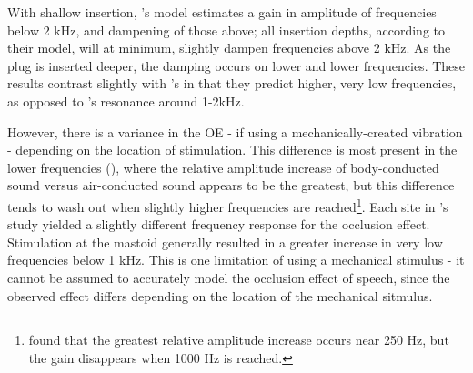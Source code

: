 With shallow insertion, \cite{stenfelt:07}'s model estimates a gain in amplitude of frequencies below 2 kHz, and dampening of those above; all insertion depths, according to their model, will at minimum, slightly dampen frequencies above 2 kHz.  As the plug is inserted deeper, the damping occurs on lower and lower frequencies. These results contrast slightly with \cite{bekesy:60}'s%
in that they predict higher, very low frequencies, as opposed to \cite{bekesy:60}'s%
resonance around 1-2kHz.

However, there is a variance in the OE - if using a mechanically-created vibration - depending on the location of stimulation.  This difference is most present in the lower frequencies (\cite{dean:00}), where the relative amplitude increase of body-conducted sound versus air-conducted sound appears to be the greatest, but this difference tends to wash out when slightly higher frequencies are reached\footnote{\cite{dean:00} found that the greatest relative amplitude increase occurs near 250 Hz, but the gain disappears when 1000 Hz is reached.}.  Each site in \cite{stenfelt:07}'s study yielded a slightly different frequency response for the occlusion effect.  Stimulation at the mastoid generally resulted in a greater increase in very low frequencies below 1 kHz.  This is one limitation of using a mechanical stimulus - it cannot be assumed to accurately model the occlusion effect of speech, since the observed effect differs depending on the location of the mechanical sitmulus.


